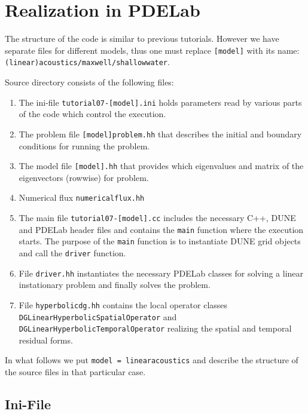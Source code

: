 \documentclass[a4paper,12pt]{article}
\theoremstyle{definition}
\theoremstyle{definition}
\begin{document}
\section{Realization in PDELab}

The structure of the code is similar to previous tutorials. However we have separate files for different models, thus one must replace \lstinline{[model]} with its name: \lstinline{(linear)acoustics/maxwell/shallowwater}. 

Source directory consists of the following files:
\begin{enumerate}[1)]
\item The ini-file
\lstinline{tutorial07-[model].ini} holds parameters read by various parts of the code
which control the execution.
\item The problem file \lstinline{[model]problem.hh} that describes the initial and boundary conditions for running the problem.
\item The model file \lstinline{[model].hh} that provides  which eigenvalues and matrix  of the eigenvectors (rowwise) for problem.
\item Numerical flux \lstinline{numericalflux.hh}
\item The main file \lstinline{tutorial07-[model].cc} includes the necessary C++,
DUNE and PDELab header files
and contains the \lstinline{main} function where the execution starts.
The purpose of the \lstinline{main} function is
to instantiate DUNE grid objects and call the \lstinline{driver} function.
\item File \lstinline{driver.hh} instantiates the necessary PDELab classes
for solving a linear instationary problem and finally solves the problem.
\item File \lstinline{hyperbolicdg.hh} contains the local operator classes \\
\lstinline{DGLinearHyperbolicSpatialOperator} and \\
 \lstinline{DGLinearHyperbolicTemporalOperator} realizing the spatial
and temporal residual forms.

\end{enumerate}

In what follows we put  \lstinline{model = linearacoustics} and describe the structure of the source files in that particular case.

\subsection{Ini-File}
\end{document}
